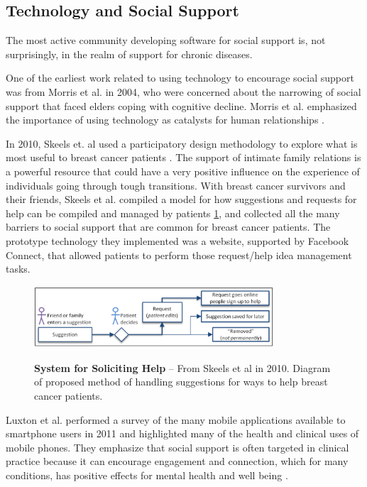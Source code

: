   \subsection{Technology and Social Support}
    The most active community developing software for social support is,
    not surprisingly, in the realm of support for chronic diseases.

    One of the earliest work related to using technology to encourage social
    support was from Morris et al. in 2004,
    who were concerned about the narrowing of social support that faced
    elders coping with cognitive decline.
    Morris et al. emphasized the importance of using technology
    as catalysts for human relationships
    \cite{morris04}.

    In 2010, Skeels et. al used a participatory design methodology to explore what is most useful
    to breast cancer patients
    \cite{skeels10}.
    The support of intimate family relations is a powerful
    resource that could
    have a very positive influence on the experience of individuals going through
    tough transitions.
    With breast cancer survivors and their friends, Skeels et al. compiled a model for how
    suggestions and requests for help can be compiled and managed by patients \ref{fig:skeels_diagram},
    and collected all the many barriers to social support that are common for breast cancer patients.
    The prototype technology they implemented was a website, supported by Facebook Connect,
    that allowed patients to perform those request/help idea management tasks.

      \begin{figure}
      \caption{\textbf{System for Soliciting Help} --
      From Skeels et al in 2010. Diagram of proposed method of handling suggestions for ways
      to help breast cancer patients.
      }
      \centering
      \includegraphics[width=0.80\textwidth]{skeels.png}
      \label{fig:skeels_diagram}
      \end{figure}

    Luxton et al. performed a survey of the many mobile applications available
    to smartphone users in 2011 and
    highlighted many of the health and clinical uses of mobile phones.
    They emphasize that social support is often targeted in clinical practice because
    it can encourage engagement and connection,
    which for many conditions, has positive effects for mental health and well being
    \cite{luxton11}.
